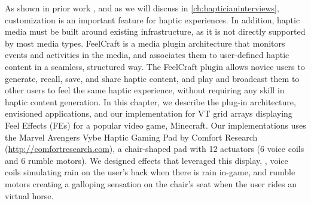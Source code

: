 As shown in prior work \cite{Seifi2013,Seifi2014}, and as we will discuss in \autoref{ch:hapticianinterviews}, customization is an important feature for haptic experiences.
In addition, haptic media must be built around existing infrastructure, as it is not directly supported by most media types.
FeelCraft is a media plugin architecture that monitors events and activities in the media, and associates them to user-defined haptic content in a seamless, structured way.
The FeelCraft plugin allows novice users to generate, recall, save, and share haptic content, and play and broadcast them to other users to feel the same haptic experience, without requiring any skill in haptic content generation.
In this chapter, we describe the plug-in architecture, envisioned applications, and our implementation for VT grid arrays displaying Feel Effects (FEs) \cite{Israr2014} for a popular video game, Minecraft.
Our implementations uses the Marvel Avengers Vybe Haptic Gaming Pad by Comfort Research (\url{http://comfortresearch.com}), a chair-shaped pad with 12 actuators (6 voice coils and 6 rumble motors).
We designed effects that leveraged this display, \eg, voice coils simulating rain on the user's back when there is rain in-game, and rumble motors creating a galloping sensation on the chair's seat when the user rides an virtual horse.


